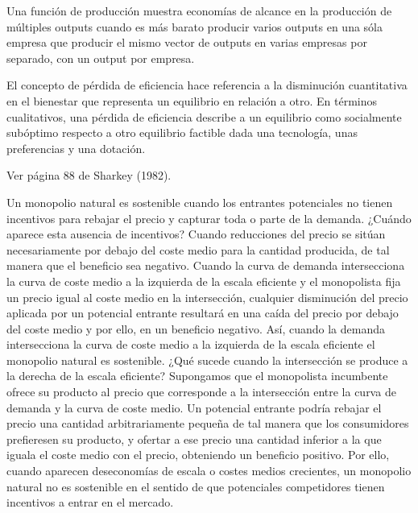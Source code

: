 \documentclass{nuevotema}
\begin{document}
Una función de producción muestra economías de alcance en la producción de múltiples outputs cuando es más barato producir varios outputs en una sóla empresa que producir el mismo vector de outputs en varias empresas por separado, con un output por empresa.


El concepto de pérdida de eficiencia hace referencia a la disminución cuantitativa en el bienestar que representa un equilibrio en relación a otro. En términos cualitativos, una pérdida de eficiencia describe a un equilibrio como socialmente subóptimo respecto a otro equilibrio factible dada una tecnología, unas preferencias y una dotación.


Ver página 88 de Sharkey (1982).

Un monopolio natural es sostenible cuando los entrantes potenciales no tienen incentivos para rebajar el precio y capturar toda o parte de la demanda. ¿Cuándo aparece esta ausencia de incentivos? Cuando reducciones del precio se sitúan necesariamente por debajo del coste medio para la cantidad producida, de tal manera que el beneficio sea negativo. Cuando la curva de demanda intersecciona la curva de coste medio a la izquierda de la escala eficiente y el monopolista fija un precio igual al coste medio en la intersección, cualquier disminución del precio aplicada por un potencial entrante resultará en una caída del precio por debajo del coste medio y por ello, en un beneficio negativo. Así, cuando la demanda intersecciona la curva de coste medio a la izquierda de la escala eficiente el monopolio natural es sostenible. ¿Qué sucede cuando la intersección se produce a la derecha de la escala eficiente? Supongamos que el monopolista incumbente ofrece su producto al precio que corresponde a la intersección entre la curva de demanda y la curva de coste medio. Un potencial entrante podría rebajar el precio una cantidad arbitrariamente pequeña de tal manera que los consumidores prefieresen su producto, y ofertar a ese precio una cantidad inferior a la que iguala el coste medio con el precio, obteniendo un beneficio positivo. Por ello, cuando aparecen deseconomías de escala o costes medios crecientes, un monopolio natural no es sostenible en el sentido de que potenciales competidores tienen incentivos a entrar en el mercado.


\end{document}
